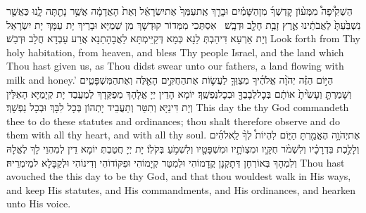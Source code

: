 {הַשְׁקִ֩יפָה֩ מִמְּע֨וֹן קׇדְשְׁךָ֜ מִן\maqqaf הַשָּׁמַ֗יִם וּבָרֵ֤ךְ אֶֽת\maqqaf עַמְּךָ֙ אֶת\maqqaf יִשְׂרָאֵ֔ל וְאֵת֙ הָאֲדָמָ֔ה אֲשֶׁ֥ר נָתַ֖תָּה לָ֑נוּ כַּאֲשֶׁ֤ר נִשְׁבַּ֙עְתָּ֙ לַאֲבֹתֵ֔ינוּ אֶ֛רֶץ זָבַ֥ת חָלָ֖ב וּדְבָֽשׁ׃ \setuma }
{אִסְתַּכִי מִמְּדוֹר קוּדְשָׁךְ מִן שְׁמַיָּא וּבָרֵיךְ יָת עַמָּךְ יָת יִשְׂרָאֵל וְיָת אַרְעָא דִּיהַבְתְּ לַנָא כְּמָא דְּקַיֵּימְתָּא לַאֲבָהָתַנָא אֲרַע עָבְדָא חֲלָב וּדְבַשׁ׃}
{Look forth from Thy holy habitation, from heaven, and bless Thy people Israel, and the land which Thou hast given us, as Thou didst swear unto our fathers, a land flowing with milk and honey.’}{}
{הַיּ֣וֹם הַזֶּ֗ה יְהֹוָ֨ה אֱלֹהֶ֜יךָ מְצַוְּךָ֧ לַעֲשׂ֛וֹת אֶת\maqqaf הַחֻקִּ֥ים הָאֵ֖לֶּה וְאֶת\maqqaf הַמִּשְׁפָּטִ֑ים וְשָׁמַרְתָּ֤ וְעָשִׂ֙יתָ֙ אוֹתָ֔ם בְּכׇל\maqqaf לְבָבְךָ֖ וּבְכׇל\maqqaf נַפְשֶֽׁךָ׃}
{יוֹמָא הָדֵין יְיָ אֱלָהָךְ מְפַקְּדָךְ לְמֶעֱבַד יָת קְיָמַיָּא הָאִלֵּין וְיָת דִּינַיָּא וְתִטַּר וְתַעֲבֵיד יָתְהוֹן בְּכָל לִבָּךְ וּבְכָל נַפְשָׁךְ׃}
{This day the \lord\space thy God commandeth thee to do these statutes and ordinances; thou shalt therefore observe and do them with all thy heart, and with all thy soul.}{}
{אֶת\maqqaf יְהֹוָ֥ה הֶאֱמַ֖רְתָּ הַיּ֑וֹם לִהְיוֹת֩ לְךָ֨ לֵֽאלֹהִ֜ים וְלָלֶ֣כֶת בִּדְרָכָ֗יו וְלִשְׁמֹ֨ר חֻקָּ֧יו וּמִצְוֺתָ֛יו וּמִשְׁפָּטָ֖יו וְלִשְׁמֹ֥עַ בְּקֹלֽוֹ׃}
{יָת יְיָ חֲטַבְתְּ יוֹמָא דֵין לְמִהְוֵי לָךְ לֶאֱלָהּ וְלִמְהָךְ בְּאוֹרְחָן דְּתָקְנָן קֳדָמוֹהִי וּלְמִטַּר קְיָמוֹהִי וּפִקּוֹדוֹהִי וְדִינוֹהִי וּלְקַבָּלָא למֵימְרֵיהּ׃}
{Thou hast avouched the \lord\space this day to be thy God, and that thou wouldest walk in His ways, and keep His statutes, and His commandments, and His ordinances, and hearken unto His voice.}{}
